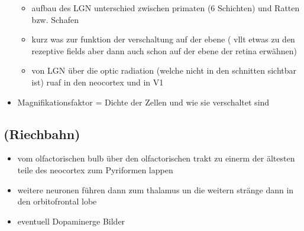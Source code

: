 \documentclass[12pt,a4paper,pdftex]{article}
\begin{document}
\begin{itemize}
\begin{itemize}
        \item aufbau des LGN unterschied zwischen primaten (6 Schichten) und Ratten bzw. Schafen
        \item kurz was zur funktion der verschaltung auf der ebene ( vllt etwas zu den rezeptive fields aber dann auch schon auf der ebene der retina erwähnen)
        \item von LGN über die optic radiation (welche nicht in den schnitten sichtbar ist) ruaf in den neocortex und in V1 
    \end{itemize}
    \item Magnifikationsfaktor = Dichte der Zellen und wie sie verschaltet sind
    \\
\end{itemize}
\subsection{(Riechbahn)}
\begin{itemize}
    \item vom olfactorischen bulb über den olfactorischen trakt zu einerm der ältesten teile des neocortex zum Pyriformen lappen
    \item weitere neuronen führen dann zum thalamus un die weitern stränge dann in den orbitofrontal lobe \cite{smith2008biology} 
    \item eventuell Dopaminerge Bilder
\end{itemize}


\newpage



\printindex
\end{document}
